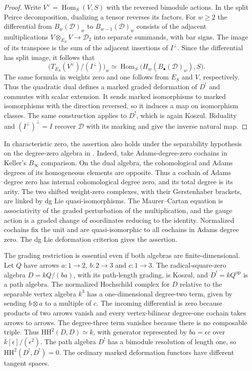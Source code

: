 \documentclass[12pt,a4paper,english,reqno]{amsart}
\numberwithin{equation}{section}
\theoremstyle{plain}
\theoremstyle{definition}
\begin{document}
\begin{proof}
Write $V^\vee=\operatorname{Hom}_S(V,S)$ with the reversed
bimodule actions. In the split Peirce decomposition, dualizing
a tensor reverses its factors. For $w\geq2$ the differential from
$B_w(\mathcal D)_w$ to $B_{w-1}(\mathcal D)_w$ consists of the
adjacent multiplications $V\otimes_{E_S}V\to\mathcal D_2$ into
separate summands, with bar signs. The image of its transpose
is the sum of the adjacent insertions of $I^\perp$. Since the
differential has split image, it follows that
\[
 \bigl(T_{E_S}(V^\vee)/(I^\perp)\bigr)_w
   \simeq
 \operatorname{Hom}_S\bigl(H_w(B_\bullet(\mathcal D)_w),S\bigr).
\]
The same formula in weights zero and one follows from $E_S$ and
$V$, respectively. Thus the quadratic dual defines a marked
graded deformation of $D^!$ and commutes with scalar extension.
It sends marked isomorphisms to marked isomorphisms with the
direction reversed, so it induces a map on isomorphism classes.
The same construction applies to $D^!$, which is again Koszul.
Biduality and $(I^\perp)^\perp=I$ recover $\mathcal D$ with its
marking and give the inverse natural map.
\end{proof}

In characteristic zero, the assertion also holds under the
separability hypothesis on the degree-zero algebra in
\cite[Section~3.5]{Keller2003Higher}. Indeed, take Adams-degree-zero
cochains in Keller's $B_\infty$ comparison. On the dual algebra,
the cohomological and Adams degrees of its homogeneous elements
are opposite. Thus a cochain of Adams degree zero has internal
cohomological degree zero, and its total degree is its arity.
The two shifted weight-zero complexes, with their Gerstenhaber
brackets, are linked by dg Lie quasi-isomorphisms. The
Maurer--Cartan equation is associativity of the graded
perturbation of the multiplication, and the gauge action is a
graded change of coordinates reducing to the identity.
Normalized cochains fix the unit and are quasi-isomorphic to
all cochains in Adams degree zero. The dg Lie deformation
criterion \cite{ManettiDeformationLectures} gives the assertion.

The grading restriction is essential even if both algebras are
finite-dimensional. Let $Q$ have arrows $a:1\to2$, $b:2\to3$
and $c:1\to3$. The radical-square-zero algebra $D=kQ/(ba)$,
with its path-length grading, is Koszul, and $D^!=kQ^{\mathrm{op}}$
is a path algebra. The normalized Hochschild complex for $D$
relative to the separable vertex algebra $k^3$ has a
one-dimensional degree-two term, given by sending $b\otimes a$
to a multiple of $c$. The incoming differential is zero because
products of two arrows vanish and every vertex-bilinear
degree-one cochain takes arrows to arrows. The degree-three
term vanishes because there is no composable triple. Thus
$\mathrm{HH}^2(D,D)\simeq k$, with generator represented by
$ba=\epsilon c$ over $k[\epsilon]/(\epsilon^2)$. The path algebra
$D^!$ has a bimodule resolution of length one, so
$\mathrm{HH}^2(D^!,D^!)=0$. The ordinary marked deformation
functors have different tangent spaces.
\end{document}
